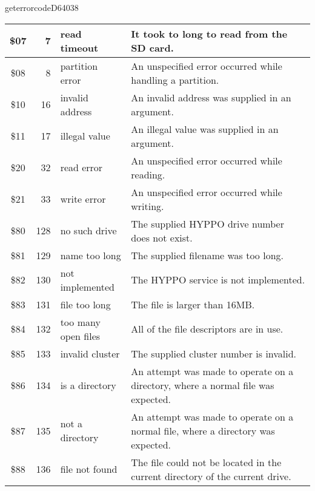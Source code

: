 \begin{hyppotrap}{geterrorcode}{D640}{38}
{\begin{longtable}{|c|r|l|p{8cm}|}
    \$07 & 7 & read timeout &
    It took to long to read from the SD card.
    \\\hline
    \index{HYPPO Error Codes!\$08}
    \$08 & 8 & partition error &
    An unspecified error occurred while handling a partition.
    \\\hline
    \index{HYPPO Error Codes!\$10}
    \$10 & 16 & invalid address &
    An invalid address was supplied in an argument.
    \\\hline
    \index{HYPPO Error Codes!\$11}
    \$11 & 17 & illegal value &
    An illegal value was supplied in an argument.
    \\\hline
    \index{HYPPO Error Codes!\$20}
    \$20 & 32 & read error &
    An unspecified error occurred while reading.
    \\\hline
    \index{HYPPO Error Codes!\$21}
    \$21 & 33 & write error &
    An unspecified error occurred while writing.
    \\\hline
    \index{HYPPO Error Codes!\$80}
    \$80 & 128 & no such drive &
    The supplied HYPPO drive number does not exist.
    \\\hline
    \index{HYPPO Error Codes!\$81}
    \$81 & 129 & {name too long} &
    The supplied filename was too long.
    \\\hline
    \index{HYPPO Error Codes!\$82}
    \$82 & 130 & not implemented &
    The HYPPO service is not implemented.
    \\\hline
    \index{HYPPO Error Codes!\$83}
    \$83 & 131 & file too long &
    The file is larger than 16MB.
    \\\hline
    \index{HYPPO Error Codes!\$84}
    \$84 & 132 & \makecell[tl]{too many\\open files} &
    All of the file descriptors are in use.
    \\\hline
    \index{HYPPO Error Codes!\$85}
    \$85 & 133 & invalid cluster &
    The supplied cluster number is invalid.
    \\\hline
    \index{HYPPO Error Codes!\$86}
    \$86 & 134 & is a directory &
    An attempt was made to operate on a directory, where a normal file was
    expected.
    \\\hline
    \index{HYPPO Error Codes!\$87}
    \$87 & 135 & not a directory &
    An attempt was made to operate on a normal file, where a directory was
    expected.
    \\\hline
    \index{HYPPO Error Codes!\$88}
    \$88 & 136 & file not found &
    The file could not be located in the current directory of the current drive.

\end{longtable}}
\end{hyppotrap}
